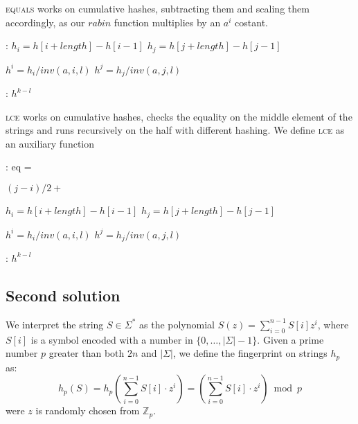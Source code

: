 \textsc{equals} works on cumulative hashes, subtracting them and scaling them
accordingly, as our $rabin$ function multiplies by an $a^{i}$ costant.

\begin{algorithmic}[1]
  :
    \State $h_i = h[i + length] - h[i - 1]$\;
    \State $h_j = h[j + length] - h[j - 1]$\;

    \State $h^{i} = h_i / inv(a, i, l)$\;
    \State $h^{j} = h_j / inv(a, j, l)$\;

    \;
    \EndFunction

    :
    \Return $h^{k - l}$
    \EndFunction
\end{algorithmic}

\textsc{lce} works on cumulative hashes, checks the equality on the middle element
of the strings and runs recursively on the half with different hashing.
We define \textsc{lce} as an auxiliary function

\begin{algorithmic}[1]
  :
    \State eq = \;

        \Else $(j - i) / 2 + $      %
    \EndIf

    \State $h_i = h[i + length] - h[i - 1]$\;
    \State $h_j = h[j + length] - h[j - 1]$\;

    \State $h^{i} = h_i / inv(a, i, l)$\;
    \State $h^{j} = h_j / inv(a, j, l)$\;

    \;
    \EndFunction

    :
    \Return $h^{k - l}$
    \EndFunction
\end{algorithmic}

\subsection{Second solution}

We interpret the string $S \in \Sigma^*$ as the polynomial $S(z)=\sum_{i=0}^{n-1}S[i]z^i$, where $S[i]$ is a symbol encoded with a number in $\{0, \dots, |\Sigma|-1\}$. Given a prime number $p$ greater than both $2n$ and $|\Sigma|$, we define the fingerprint on strings $h_p$ as:
$$h_p(S)=h_p\left(\sum_{i=0}^{n-1}S[i] \cdot z^i\right) = \left(\sum_{i=0}^{n-1}S[i]  \cdot z^i\right) \bmod p$$
were $z$ is randomly chosen from $\mathbb{Z}_p$.

